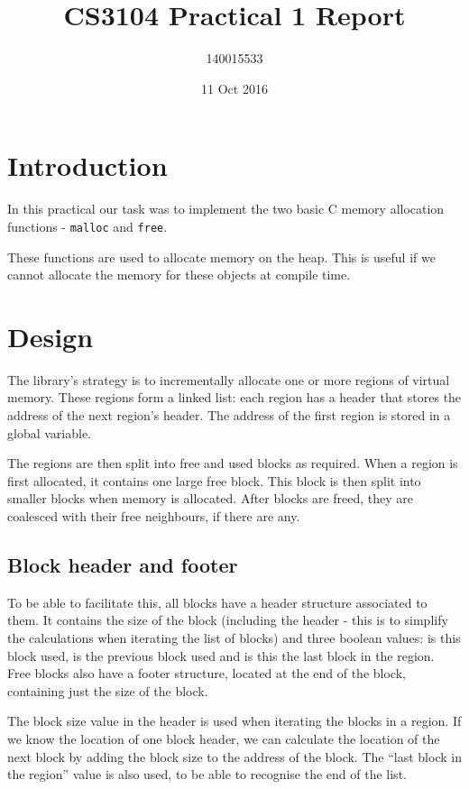 \documentclass{article}
\title{CS3104 Practical 1 Report}
\author{140015533}
\date{11 Oct 2016}
\begin{document}
\maketitle

\section{Introduction}

In this practical our task was to implement the two basic C memory allocation functions - \lstinline{malloc} and \lstinline{free}.

These functions are used to allocate memory on the heap. This is useful if we cannot allocate the memory for these objects at compile time.

\section{Design}

The library's strategy is to incrementally allocate one or more regions of virtual memory. These regions form a linked list: each region has a header that stores the address of the next region's header. The address of the first region is stored in a global variable.

The regions are then split into free and used blocks as required. When a region is first allocated, it contains one large free block. This block is then split into smaller blocks when memory is allocated. After blocks are freed, they are coalesced with their free neighbours, if there are any.

\subsection{Block header and footer}

To be able to facilitate this, all blocks have a header structure associated to them. It contains the size of the block (including the header - this is to simplify the calculations when iterating the list of blocks) and three boolean values: is this block used, is the previous block used and is this the last block in the region. Free blocks also have a footer structure, located at the end of the block, containing just the size of the block.

The block size value in the header is used when iterating the blocks in a region. If we know the location of one block header, we can calculate the location of the next block by adding the block size to the address of the block.
The ``last block in the region'' value is also used, to be able to recognise the end of the list.
\end{document}
